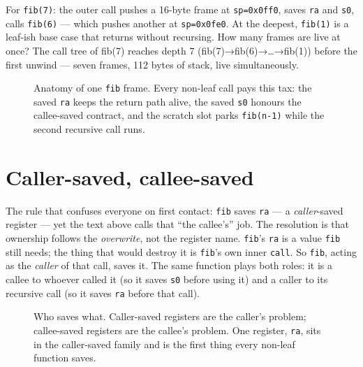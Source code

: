 \begin{example}\label{ex:frametrace04}
For \texttt{fib(7)}: the outer call pushes a 16-byte frame at
\texttt{sp=0x0ff0}, saves \texttt{ra} and \texttt{s0}, calls
\texttt{fib(6)} --- which pushes another at \texttt{sp=0x0fe0}. At the
deepest, \texttt{fib(1)} is a leaf-ish base case that returns without
recursing. How many frames are live at once? The call tree of fib(7)
reaches depth 7 (fib(7)→fib(6)→…→fib(1)) before the first unwind ---
seven frames, 112 bytes of stack, live simultaneously.
\end{example}

\begin{figure}[t]
\centering

\caption[The stack frame]{Anatomy of one \texttt{fib} frame. Every
non-leaf call pays this tax: the saved \texttt{ra} keeps the return
path alive, the saved \texttt{s0} honours the callee-saved contract,
and the scratch slot parks \texttt{fib(n-1)} while the second
recursive call runs.}
\label{fig:frame04}
\end{figure}

\section{Caller-saved, callee-saved}
\label{sec:ownership04}

The rule that confuses everyone on first contact: \texttt{fib} saves
\texttt{ra} --- a \emph{caller}-saved register --- yet the text above
calls that ``the callee's'' job. The resolution is that ownership
follows the \emph{overwrite}, not the register name. \texttt{fib}'s
\texttt{ra} is a value \texttt{fib} still needs; the thing that would
destroy it is \texttt{fib}'s own inner \texttt{call}. So \texttt{fib},
acting as the \emph{caller} of that call, saves it. The same function
plays both roles: it is a callee to whoever called it (so it saves
\texttt{s0} before using it) and a caller to its recursive call (so it
saves \texttt{ra} before that call).

\begin{figure}[t]
\centering

\caption[Caller- vs callee-saved]{Who saves what. Caller-saved
registers are the caller's problem; callee-saved registers are the
callee's problem. One register, \texttt{ra}, sits in the caller-saved
family and is the first thing every non-leaf function saves.}
\label{fig:ownership04}
\end{figure}

